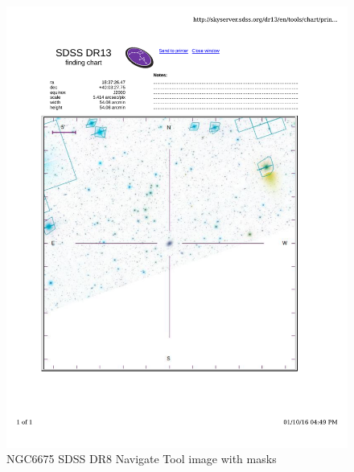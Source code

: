 \documentclass[10pt,letterpaper]{article}
\begin{document}
\begin{figure}[h!]
\centering
\includegraphics[scale=0.7]{figures/NGC6675.pdf}
\caption{NGC6675 SDSS DR8 Navigate Tool image with masks}
\end{figure}
\end{document}
